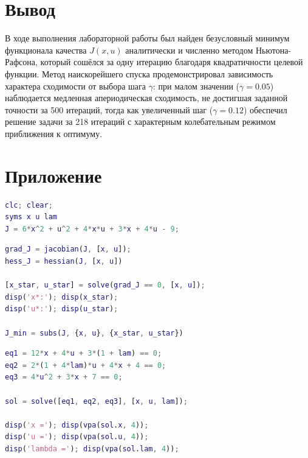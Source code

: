 \documentclass[a4paper,12pt]{article}
\begin{document}
	
	
	\section{Вывод}
	
	В ходе выполнения лабораторной работы был найден безусловный минимум функционала качества $J(x,u)$ аналитически и численно методом Ньютона-Рафсона, который сошёлся за одну итерацию благодаря квадратичности целевой функции. Метод наискорейшего спуска продемонстрировал зависимость характера сходимости от выбора шага $\gamma$: при малом значении ($\gamma=0.05$) наблюдается медленная апериодическая сходимость, не достигшая заданной точности за 500 итераций, тогда как увеличенный шаг ($\gamma=0.12$) обеспечил решение задачи за 218 итераций с характерным колебательным режимом приближения к оптимуму.
	
	
	
	
	
	
	
	
	
	
	
	
	
	
	
	
	
	

	
\newpage
\section{Приложение}

\begin{lstlisting}[caption={Инициализация}, language=matlab]
clc; clear;
syms x u lam
J = 6*x^2 + u^2 + 4*x*u + 3*x + 4*u - 9;
\end{lstlisting}

\begin{lstlisting}[caption={\(J, H\) и оптимальная точка}, language=matlab]
grad_J = jacobian(J, [x, u]);
hess_J = hessian(J, [x, u])

[x_star, u_star] = solve(grad_J == 0, [x, u]);
disp('x*:'); disp(x_star);
disp('u*:'); disp(u_star);

J_min = subs(J, {x, u}, {x_star, u_star})
\end{lstlisting}


\begin{lstlisting}[caption={Решение системы уравнений}, language=matlab]
eq1 = 12*x + 4*u + 3*(1 + lam) == 0;
eq2 = 2*(1 + 4*lam)*u + 4*x + 4 == 0;
eq3 = 4*u^2 + 3*x + 7 == 0;

sol = solve([eq1, eq2, eq3], [x, u, lam]);

disp('x ='); disp(vpa(sol.x, 4));
disp('u ='); disp(vpa(sol.u, 4));
disp('lambda ='); disp(vpa(sol.lam, 4));
\end{lstlisting}
\end{document}
